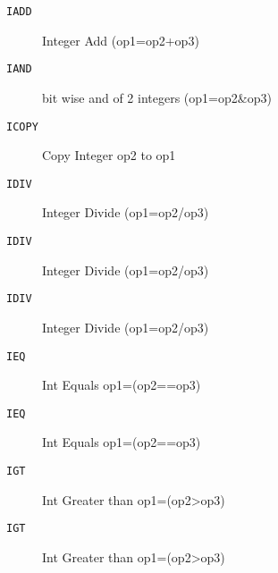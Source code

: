 
\begin{description}
\item[\texttt{IADD       }]  Integer Add (op1=op2+op3)\\
\end{description}

\begin{description}
\item[\texttt{IAND       }]  bit wise and of 2 integers (op1=op2\&op3)\\
\end{description}

\begin{description}
\item[\texttt{ICOPY      }]  Copy Integer op2 to op1\\
\end{description}

\begin{description}
\item[\texttt{IDIV       }]  Integer Divide (op1=op2/op3)\\
\end{description}

\begin{description}
\item[\texttt{IDIV       }]  Integer Divide (op1=op2/op3)\\
\end{description}

\begin{description}
\item[\texttt{IDIV       }]  Integer Divide (op1=op2/op3)\\
\end{description}

\begin{description}
\item[\texttt{IEQ        }]  Int Equals op1=(op2==op3)\\
\end{description}

\begin{description}
\item[\texttt{IEQ        }]  Int Equals op1=(op2==op3)\\
\end{description}

\begin{description}
\item[\texttt{IGT        }]  Int Greater than op1=(op2>op3)\\
\end{description}

\begin{description}
\item[\texttt{IGT        }]  Int Greater than op1=(op2>op3)\\
\end{description}
